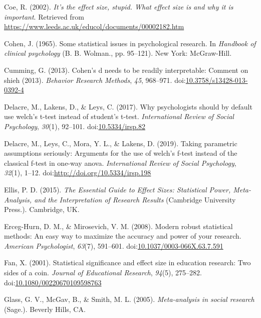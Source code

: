 \documentclass[
  man,floatsintext]{apa6}
\begin{document}
\leavevmode\hypertarget{ref-Coe_2002}{}%
Coe, R. (2002). \emph{It's the effect size, stupid. What effect size is and why it is important}. Retrieved from \url{https://www.leeds.ac.uk/educol/documents/00002182.htm}

\leavevmode\hypertarget{ref-Cohen_1965}{}%
Cohen, J. (1965). Some statistical issues in psychological research. In \emph{Handbook of clinical psychology} (B. B. Wolman., pp. 95--121). New York: McGraw-Hill.

\leavevmode\hypertarget{ref-Cumming_2013}{}%
Cumming, G. (2013). Cohen's d needs to be readily interpretable: Comment on shieh (2013). \emph{Behavior Research Methods}, \emph{45}, 968--971. doi:\href{https://doi.org/10.3758/s13428-013-0392-4}{10.3758/s13428-013-0392-4}

\leavevmode\hypertarget{ref-Delacre_et_al_2017}{}%
Delacre, M., Lakens, D., \& Leys, C. (2017). Why psychologists should by default use welch's t-test instead of student's t-test. \emph{International Review of Social Psychology}, \emph{30}(1), 92--101. doi:\href{https://doi.org/10.5334/irsp.82}{10.5334/irsp.82}

\leavevmode\hypertarget{ref-Delacre_et_al_2019}{}%
Delacre, M., Leys, C., Mora, Y. L., \& Lakens, D. (2019). Taking parametric assumptions seriously: Arguments for the use of welch's f-test instead of the classical f-test in one-way anova. \emph{International Review of Social Psychology}, \emph{32}(1), 1--12. doi:\href{https://doi.org/http://doi.org/10.5334/irsp.198}{http://doi.org/10.5334/irsp.198}

\leavevmode\hypertarget{ref-Ellis_2015}{}%
Ellis, P. D. (2015). \emph{The Essential Guide to Effect Sizes: Statistical Power, Meta-Analysis, and the Interpretation of Research Results} (Cambridge University Press.). Cambridge, UK.

\leavevmode\hypertarget{ref-Erceg-Hurn_Mirosevich_2008}{}%
Erceg-Hurn, D. M., \& Mirosevich, V. M. (2008). Modern robust statistical methods: An easy way to maximize the accuracy and power of your research. \emph{American Psychologist}, \emph{63}(7), 591--601. doi:\href{https://doi.org/10.1037/0003-066X.63.7.591}{10.1037/0003-066X.63.7.591}

\leavevmode\hypertarget{ref-Fan_2001}{}%
Fan, X. (2001). Statistical significance and effect size in education research: Two sides of a coin. \emph{Journal of Educational Research}, \emph{94}(5), 275--282. doi:\href{https://doi.org/10.1080/00220670109598763}{10.1080/00220670109598763}

\leavevmode\hypertarget{ref-Glass_et_al_1981}{}%
Glass, G. V., McGav, B., \& Smith, M. L. (2005). \emph{Meta-analysis in social research} (Sage.). Beverly Hills, CA.
\end{document}
